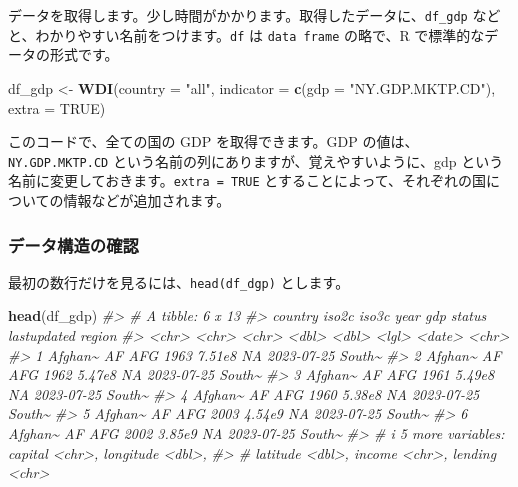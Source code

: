 \documentclass[
  xelatex, ja=standard]{bxjsbook}
\newenvironment{Shaded}{\begin{snugshade}}{\end{snugshade}}
\newcommand{\AttributeTok}[1]{\textcolor[rgb]{0.13,0.29,0.53}{#1}}
\newcommand{\CommentTok}[1]{\textcolor[rgb]{0.56,0.35,0.01}{\textit{#1}}}
\newcommand{\ConstantTok}[1]{\textcolor[rgb]{0.56,0.35,0.01}{#1}}
\newcommand{\FunctionTok}[1]{\textcolor[rgb]{0.13,0.29,0.53}{\textbf{#1}}}
\newcommand{\NormalTok}[1]{#1}
\newcommand{\OtherTok}[1]{\textcolor[rgb]{0.56,0.35,0.01}{#1}}
\newcommand{\StringTok}[1]{\textcolor[rgb]{0.31,0.60,0.02}{#1}}
\theoremstyle{definition}
\theoremstyle{definition}
\theoremstyle{definition}
\theoremstyle{definition}
\theoremstyle{remark}
\begin{document}
データを取得します。少し時間がかかります。取得したデータに、\texttt{df\_gdp} などと、わかりやすい名前をつけます。\texttt{df} は \texttt{data\ frame} の略で、R で標準的なデータの形式です。

\begin{Shaded}
\begin{Highlighting}[]
\NormalTok{df\_gdp }\OtherTok{\textless{}{-}} \FunctionTok{WDI}\NormalTok{(}\AttributeTok{country =} \StringTok{"all"}\NormalTok{, }
              \AttributeTok{indicator =} \FunctionTok{c}\NormalTok{(}\AttributeTok{gdp =} \StringTok{"NY.GDP.MKTP.CD"}\NormalTok{), }
              \AttributeTok{extra =} \ConstantTok{TRUE}\NormalTok{)}
\end{Highlighting}
\end{Shaded}

このコードで、全ての国の GDP を取得できます。GDP の値は、\texttt{NY.GDP.MKTP.CD} という名前の列にありますが、覚えやすいように、gdp という名前に変更しておきます。\texttt{extra\ =\ TRUE} とすることによって、それぞれの国についての情報などが追加されます。

\hypertarget{ux30c7ux30fcux30bfux69cbux9020ux306eux78baux8a8d-1}{%
\subsubsection{データ構造の確認}\label{ux30c7ux30fcux30bfux69cbux9020ux306eux78baux8a8d-1}}

最初の数行だけを見るには、\texttt{head(df\_dgp)} とします。

\begin{Shaded}
\begin{Highlighting}[]
\FunctionTok{head}\NormalTok{(df\_gdp)}
\CommentTok{\#\textgreater{} \# A tibble: 6 x 13}
\CommentTok{\#\textgreater{}   country iso2c iso3c  year    gdp status lastupdated region}
\CommentTok{\#\textgreater{}   \textless{}chr\textgreater{}   \textless{}chr\textgreater{} \textless{}chr\textgreater{} \textless{}dbl\textgreater{}  \textless{}dbl\textgreater{} \textless{}lgl\textgreater{}  \textless{}date\textgreater{}      \textless{}chr\textgreater{} }
\CommentTok{\#\textgreater{} 1 Afghan\textasciitilde{} AF    AFG    1963 7.51e8 NA     2023{-}07{-}25  South\textasciitilde{}}
\CommentTok{\#\textgreater{} 2 Afghan\textasciitilde{} AF    AFG    1962 5.47e8 NA     2023{-}07{-}25  South\textasciitilde{}}
\CommentTok{\#\textgreater{} 3 Afghan\textasciitilde{} AF    AFG    1961 5.49e8 NA     2023{-}07{-}25  South\textasciitilde{}}
\CommentTok{\#\textgreater{} 4 Afghan\textasciitilde{} AF    AFG    1960 5.38e8 NA     2023{-}07{-}25  South\textasciitilde{}}
\CommentTok{\#\textgreater{} 5 Afghan\textasciitilde{} AF    AFG    2003 4.54e9 NA     2023{-}07{-}25  South\textasciitilde{}}
\CommentTok{\#\textgreater{} 6 Afghan\textasciitilde{} AF    AFG    2002 3.85e9 NA     2023{-}07{-}25  South\textasciitilde{}}
\CommentTok{\#\textgreater{} \# i 5 more variables: capital \textless{}chr\textgreater{}, longitude \textless{}dbl\textgreater{},}
\CommentTok{\#\textgreater{} \#   latitude \textless{}dbl\textgreater{}, income \textless{}chr\textgreater{}, lending \textless{}chr\textgreater{}}
\end{Highlighting}
\end{Shaded}
\end{document}
